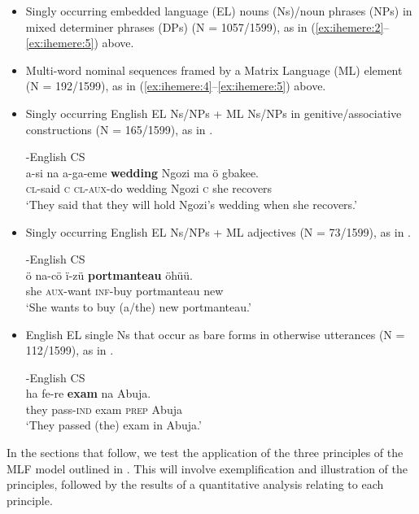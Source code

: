 \documentclass[output=paper]{langsci/langscibook}
\begin{document}
\begin{itemize}[noitemsep]
 \item Singly occurring embedded language (EL) nouns (Ns)/noun phrases (NPs) in mixed determiner phrases (DPs) (N = 1057/1599), as in (\ref{ex:ihemere:2}--\ref{ex:ihemere:5}) above. 

 \item Multi-word nominal sequences framed by a Matrix Language (ML) element (N = 192/1599), as in (\ref{ex:ihemere:4}--\ref{ex:ihemere:5}) above.

 \item Singly occurring English EL Ns/NPs +  ML Ns/NPs in genitive/associative constructions (N = 165/1599), as in .
 
\newpage 
\ea\label{ex:ihemere:6}
{-English \textsc{CS}}\\
\gll a-si    na  a-ga-eme   \textbf{wedding}  Ngozi  ma   ö  gbakee.\\
     \textsc{cl}-said  \textsc{c}  \textsc{cl-aux}-do  wedding  Ngozi  \textsc{c}  she  recovers\\
\glt ‘They said that they will hold Ngozi’s wedding when she recovers.’
\z

\item Singly occurring English EL Ns/NPs +  ML adjectives (N = 73/1599), as in .
 

\ea\label{ex:ihemere:7}
{-English \textsc{CS}}\\
\gll ö  na-cö    ï-zü    \textbf{portmanteau}  öhüü. \\
     she  \textsc{aux}-want  \textsc{inf}-buy  portmanteau  new\\
\glt ‘She wants to buy (a/the) new portmanteau.’
\z
\item English EL single Ns that occur as bare forms in otherwise  utterances (N = 112/1599), as in .


\ea\label{ex:ihemere:8}
{-English \textsc{CS}}\\
\gll ha    fe-re    \textbf{exam}  na   Abuja.\\
     they  pass-\textsc{ind}  exam  \textsc{prep}  Abuja \\
\glt ‘They passed (the) exam in Abuja.’
\z

\end{itemize}

In the sections that follow, we test the application of the three principles of the MLF model outlined in . This will involve exemplification and illustration of the principles, followed by the results of a quantitative analysis relating to each principle. 
\end{document}
